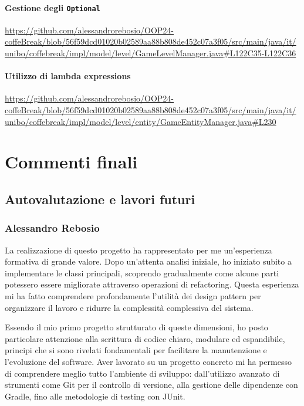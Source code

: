 \documentclass[a4paper,12pt]{report}
\begin{document}
\subsubsection{Gestione degli \texttt{Optional}}
\begin{sloppypar}
	\raggedright
	\url{https://github.com/alessandrorebosio/OOP24-coffeBreak/blob/56f59dcd01020b02589aa88b808de452c07a3f05/src/main/java/it/unibo/coffebreak/impl/model/level/GameLevelManager.java#L122C35-L122C36}
\end{sloppypar}

\subsubsection{Utilizzo di lambda expressions}
\begin{sloppypar}
	\raggedright
	\url{https://github.com/alessandrorebosio/OOP24-coffeBreak/blob/56f59dcd01020b02589aa88b808de452c07a3f05/src/main/java/it/unibo/coffebreak/impl/model/level/entity/GameEntityManager.java#L230}
\end{sloppypar}
\chapter{Commenti finali}
\section{Autovalutazione e lavori futuri}
\subsection{Alessandro Rebosio}
La realizzazione di questo progetto ha rappresentato per me un'esperienza formativa di grande valore. Dopo un'attenta analisi iniziale, ho iniziato subito a implementare le classi
principali, scoprendo gradualmente come alcune parti potessero essere migliorate attraverso operazioni di refactoring. Questa esperienza mi ha fatto comprendere profondamente
l'utilità dei design pattern per organizzare il lavoro e ridurre la complessità complessiva del sistema.

Essendo il mio primo progetto strutturato di queste dimensioni, ho posto particolare attenzione alla scrittura di codice chiaro, modulare ed espandibile, principi che si
sono rivelati fondamentali per facilitare la manutenzione e l'evoluzione del software. Aver lavorato su un progetto concreto mi ha permesso di comprendere meglio tutto l'ambiente
di sviluppo: dall'utilizzo avanzato di strumenti come Git per il controllo di versione, alla gestione delle dipendenze con Gradle, fino alle metodologie di testing con JUnit.
\end{document}

